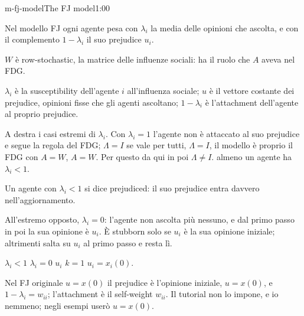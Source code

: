 \begin{slide}{m-fj-model}{The FJ model}{1:00}
  \begin{discorso}
    \item Nel modello FJ ogni agente pesa con $\lambda_i$ la media delle opinioni che ascolta, e con il complemento $1-\lambda_i$ il suo {\color{red}} {\color{blue}prejudice} $u_i$.
    \item $W$ è row-stochastic, la matrice delle influenze sociali: ha il ruolo che $A$ aveva nel FDG.
    \item $\lambda_i$ è la {\color{red}} {\color{blue}susceptibility} dell'agente $i$ all'influenza sociale; $u$ è il vettore costante dei {\color{red}} {\color{blue}prejudice,} opinioni fisse che gli agenti ascoltano; $1-\lambda_i$ è {\color{red}} {\color{blue}l'attachment dell'agente} al proprio {\color{red}} {\color{blue}prejudice.}
    \item {\color{red}} {\color{blue}A destra i casi estremi di $\lambda_i$. Con} $\lambda_i=1$ l'agente {\color{blue}non è attaccato al suo prejudice e} segue la regola del FDG; {\color{red}} {\color{red}$\Lambda=I$} {\color{blue}se vale per tutti, $\Lambda=I$,} il modello è proprio il FDG con {\color{red}$A=W$,} {\color{red}} {\color{blue}$A=W$. Per questo} da qui in poi {\color{red}$\Lambda\neq I$.} {\color{blue}almeno un agente ha $\lambda_i<1$.}
    \item {\color{blue}Un agente con $\lambda_i<1$ si dice prejudiced: il suo prejudice entra davvero nell'aggiornamento.}
    \item {\color{blue}All'estremo opposto, $\lambda_i=0$: l'agente non ascolta più nessuno, e dal primo passo in poi la sua opinione è $u_i$. È stubborn solo se $u_i$ è la sua opinione iniziale; altrimenti salta su $u_i$ al primo passo e resta lì.}
    \item {\color{red}} {\color{red}$\lambda_i<1$} {\color{red}   } {\color{red}$\lambda_i=0$} {\color{red} } {\color{red}$u_i$} {\color{red}} {\color{red}$k=1$} {\color{red}        } {\color{red}$u_i=x_i(0)$.}
    \item Nel {\color{red}} FJ originale {\color{red}$u=x(0)$} {\color{blue}il prejudice è l'opinione iniziale, $u=x(0)$,} e {\color{red}$1-\lambda_i=w_{ii}$;} {\color{red}   } {\color{blue}l'attachment è il self-weight $w_{ii}$. Il tutorial} non lo {\color{red}} {\color{blue}impone, e io nemmeno; negli esempi userò $u=x(0)$.}

\end{discorso}
\end{slide}
